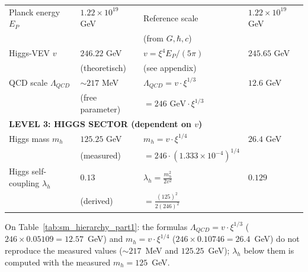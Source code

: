 \begin{table}[htbp]
{\begin{tabular}{p{3.8cm}p{2.5cm}p{3.5cm}p{2.8cm}}
	Planck energy $E_P$ & $1.22 \times 10^{19}$ GeV & Reference scale & $1.22 \times 10^{19}$ GeV \\
	& & (from $G, \hbar, c$) & \\[0.3em]
	
Higgs-VEV $v$ & $246.22$ GeV & $v = \xi^4 E_P/(5\pi)$ & $245.65$ GeV \\
& (theoretisch) & (see appendix) & \\[0.3em]
	
	QCD scale $\Lambda_{QCD}$ & $\sim 217$ MeV & $\Lambda_{QCD} = v \cdot \xi^{1/3}$ & $12.6$ GeV \\
	& (free parameter) & $= 246 \text{ GeV} \cdot \xi^{1/3}$ & \\[0.3em]
	
	\midrule
	\multicolumn{4}{l}{\textbf{LEVEL 3: HIGGS SECTOR (dependent on $v$)}} \\
	\midrule
	
	Higgs mass $m_h$ & $125.25$ GeV & $m_h = v \cdot \xi^{1/4}$ & $26.4$ GeV \\
	& (measured) & $= 246 \cdot (1.333 \times 10^{-4})^{1/4}$ & \\[0.3em]
	
	Higgs self-coupling $\lambda_h$ & $0.13$ & $\lambda_h = \frac{m_h^2}{2v^2}$ & $0.129$ \\
	& (derived) & $= \frac{(125)^2}{2(246)^2}$ & \\[0.3em]
	
\end{tabular}%
}
\end{table}
On Table~\ref{tab:sm_hierarchy_part1}: the formulas $\Lambda_{QCD} = v\cdot\xi^{1/3}$ ($246\times0.05109 = 12.57$~GeV) and $m_h = v\cdot\xi^{1/4}$ ($246\times0.10746 = 26.4$~GeV) do not reproduce the measured values ($\sim 217$~MeV and $125.25$~GeV); $\lambda_h$ below them is computed with the measured $m_h = 125$~GeV.

